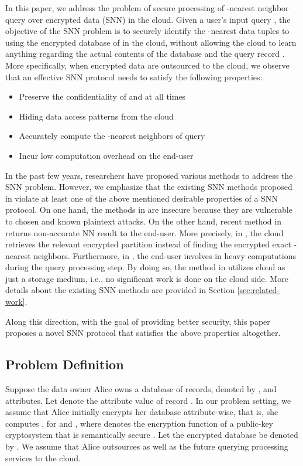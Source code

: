 \documentclass{article}
\begin{document}
In this paper, we address the problem of secure processing 
of -nearest neighbor query over encrypted data (SNN) in the cloud. 
Given a user's input query , the objective of the SNN problem is to securely 
identify the -nearest data tuples to  using the encrypted database of 
 in the cloud, without allowing the cloud to learn anything regarding the actual contents of 
the database  and the query record .
More specifically, when encrypted data are outsourced to the cloud, we observe that 
an effective SNN protocol needs to satisfy the following properties: 
\begin{itemize}\itemsep=0pt
\item Preserve the confidentiality of  and  at all times
\item Hiding data access patterns from the cloud
\item Accurately compute the -nearest neighbors of query 
\item Incur low computation overhead on the end-user
 \end{itemize}
In the past few years, researchers have proposed various methods \cite{wong2009secure,hu2011processing,yaosecure} to 
address the SNN problem. However, we emphasize that the 
existing SNN methods proposed in \cite{wong2009secure,hu2011processing} violate at 
least one of the above mentioned desirable properties of a SNN protocol.
On one hand, the methods in \cite{wong2009secure,hu2011processing} are insecure because they 
are vulnerable to chosen and known plaintext attacks. 
On the other hand, recent method in \cite{yaosecure} returns non-accurate 
NN result to the end-user. More precisely, in \cite{yaosecure}, the cloud retrieves the relevant encrypted 
partition instead of finding the encrypted exact -nearest neighbors. Furthermore, in 
\cite{hu2011processing,yaosecure}, the end-user involves in heavy computations during the query processing step. 
By doing so, the method in \cite{yaosecure} utilizes cloud as just a storage medium, i.e., no significant 
work is done on the cloud side.   
More details about the existing SNN methods are provided in Section \ref{sec:related-work}. 

Along this direction, with the goal of providing better security, this paper proposes a 
novel SNN protocol that satisfies the above properties altogether. 
\subsection{Problem Definition}\label{sec:problemfor}
Suppose the data owner Alice owns a database  of 
 records, denoted by ,  
and  attributes. Let
 denote the  attribute value of record . In our problem setting, we 
assume that Alice 
initially encrypts her database attribute-wise, that is, 
she computes , for  and , where  denotes the encryption 
function of a public-key cryptosystem that is semantically 
secure \cite{paillier-99}. Let the encrypted database be denoted by . We assume 
that Alice outsources  as well as the future querying processing services to the cloud.
\end{document}
